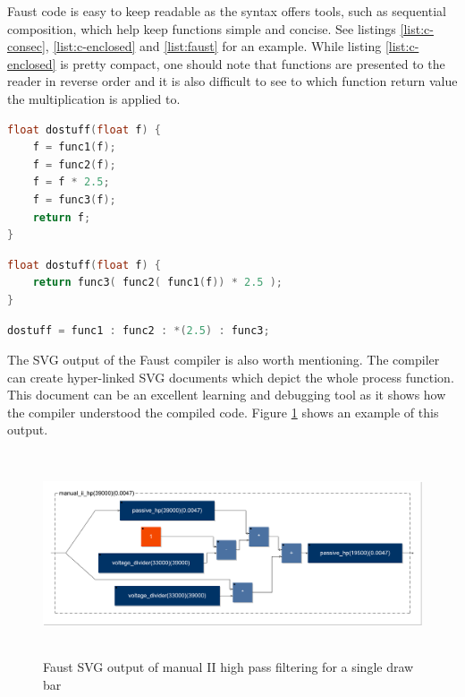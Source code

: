 \documentclass[11pt,a4paper]{article}
\begin{document}
Faust code is easy to keep readable as the syntax offers tools, such as sequential composition, which help keep functions simple and concise. See listings \ref{list:c-consec}, \ref{list:c-enclosed} and \ref{list:faust} for an example. While listing \ref{list:c-enclosed} is pretty compact, one should note that functions are presented to the reader in reverse order and it is also difficult to see to which function return value the multiplication is applied to.

\begin{lstlisting}[language=C,label=list:c-consec,caption=Consecutive calls]
float dostuff(float f) {
	f = func1(f);
	f = func2(f);
	f = f * 2.5;
	f = func3(f);
	return f;
}
\end{lstlisting}

\begin{lstlisting}[language=C,label=list:c-enclosed,caption=Enclosed statements]
float dostuff(float f) {
	return func3( func2( func1(f)) * 2.5 );
}
\end{lstlisting}

\begin{lstlisting}[language=C,label=list:faust,caption=Faust sequential composition]
dostuff = func1 : func2 : *(2.5) : func3;
\end{lstlisting}

The SVG output of the Faust compiler is also worth mentioning. The compiler can create hyper-linked SVG documents which depict the whole process function. This document can be an excellent learning and debugging tool as it shows how the compiler understood the compiled code. Figure \ref{fig:svgoutput} shows an example of this output.

\begin{figure}[tbp]
\centering
\includegraphics[height=60mm,angle=270]{manual_ii_hp.pdf}
\caption{Faust SVG output of manual II high pass filtering for a single draw bar}
\label{fig:svgoutput}
\end{figure}
\end{document}
